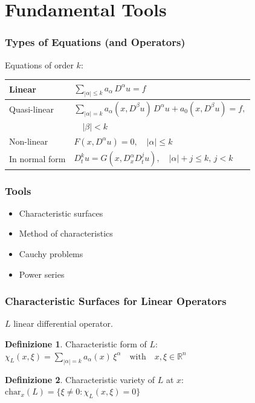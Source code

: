 \documentclass[serif,notheorems]{beamer}
\theoremstyle{definition} %
\newtheorem{definition}{Definizione}[section] %
\theoremstyle{remark}
\begin{document}
\section{Fundamental Tools}

\begin{frame}
\frametitle{Types of Equations (and Operators)}
Equations of order $k$:
\begin{table}
\renewcommand{\arraystretch}{2}
\begin{tabular}{l l} 
\hline \hline
 Linear & $\sum_{|\alpha |\leq k} a_\alpha \, D^\alpha u = f$ \\
 \hline
 \vspace{-2mm}
 Quasi-linear & $\sum_{|\alpha |= k} a_\alpha (x,D^\beta u) \, D^\alpha u +  a_0(x,D^\beta u)= f,$\\
 & $\quad |\beta |<k $ \\
 \hline
 Non-linear & $F(x,D^\alpha u)=0, \quad |\alpha | \leq k$ \\
 \hline
 In normal form & $D_{t}^k u = G(x, D^\alpha_x D^j_t u), \quad |\alpha |+j \leq k, \, j < k$ \\
 \hline \hline
\end{tabular}
\end{table}
\end{frame}

\begin{frame}
\frametitle{Tools}
\begin{itemize}
\item Characteristic surfaces
\item Method of characteristics
\item Cauchy problems
\item Power series
\end{itemize}
\end{frame}

\begin{frame}
\frametitle{Characteristic Surfaces for Linear Operators}
$L$ linear differential operator.
\begin{definition}
Characteristic form of $L$:\\ $\chi_L(x,\xi)=\sum\limits_{|\alpha |= k} a_\alpha(x) \, \xi^\alpha \quad \text{with} \quad x,\xi \in \mathbb{R}^n$
\end{definition}

\begin{definition}
Characteristic variety of $L$ at $x$:\\ $\text{char}_x (L)= \{ \xi \neq 0 : \chi_L(x,\xi)=0 \}$
\end{definition}
\end{frame}
\end{document}
